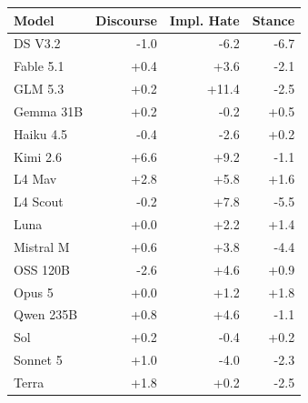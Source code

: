\begin{tabular}{lrrr}
\toprule
Model & Discourse & Impl. Hate & Stance \\
\midrule
DS V3.2 & -1.0 & -6.2 & -6.7 \\
Fable 5.1 & +0.4 & +3.6 & -2.1 \\
GLM 5.3 & +0.2 & +11.4 & -2.5 \\
Gemma 31B & +0.2 & -0.2 & +0.5 \\
Haiku 4.5 & -0.4 & -2.6 & +0.2 \\
Kimi 2.6 & +6.6 & +9.2 & -1.1 \\
L4 Mav & +2.8 & +5.8 & +1.6 \\
L4 Scout & -0.2 & +7.8 & -5.5 \\
Luna & +0.0 & +2.2 & +1.4 \\
Mistral M & +0.6 & +3.8 & -4.4 \\
OSS 120B & -2.6 & +4.6 & +0.9 \\
Opus 5 & +0.0 & +1.2 & +1.8 \\
Qwen 235B & +0.8 & +4.6 & -1.1 \\
Sol & +0.2 & -0.4 & +0.2 \\
Sonnet 5 & +1.0 & -4.0 & -2.3 \\
Terra & +1.8 & +0.2 & -2.5 \\
\bottomrule
\end{tabular}
